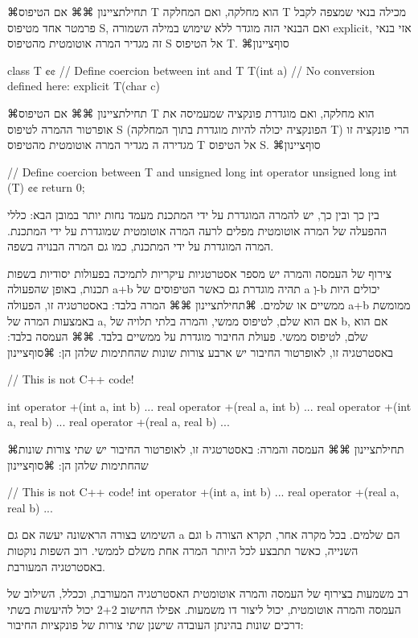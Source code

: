   ⌘תחילת{ציינון}
      ⌘⌘ אם הטיפוס T הוא מחלקה, ואם המחלקה T מכילה בנאי שמצפה לקבל פרמטר אחד מטיפוס S, ואם הבנאי הזה מוגדר ללא שימוש במילה השמורה explicit, אזי בנאי זה מגדיר המרה אוטומטית מהטיפוס S אל הטיפוס T.
    ⌘סוף{ציינון}

      class T {¢¢
        // Define coercion between int and T
        T(int a) {}
        // No conversion defined here:
        explicit T(char c) {}
      }

      ⌘תחילת{ציינון}
      ⌘⌘ אם הטיפוס T הוא מחלקה, ואם מוגדרת פונקציה שמעמיסה את אופרטור ההמרה לטיפוס S (הפונקציה יכולה להיות מוגדרת בתוך המחלקה T) הרי פונקציה זו מגדירה ה מגדיר המרה אוטומטית מהטיפוס T אל הטיפוס S.
    ⌘סוף{ציינון}

      // Define coercion between T and unsigned long int
      operator unsigned long int (T) {¢¢
        return 0;
      }

      בין כך ובין כך, יש להמרה המוגדרת על ידי המתכנת מעמד נחות יותר במובן הבא: כללי ההפעלה של המרה אוטומטית מפלים לרעה המרה אוטומטית שמוגדרת על ידי המתכנת. המרה המוגדרת על ידי המתכנת, כמו גם המרה הבנויה בשפה.

      צירוף של העמסה והמרה
      יש מספר אסטרטגיות עיקריות לתמיכה בפעולות יסודיות בשפות תכנות, באופן שהפעולה a+b תהיה מוגדרת גם כאשר הטיפוסים של a וְ-b יכולים היות ממשיים או שלמים.
      ⌘תחילת{ציינון}
      ⌘⌘ המרה בלבד: באסטרטגיה זו, הפעולה a+b ממומשת באמצעות המרה של a, אם הוא שלם, לטיפוס ממשי, והמרה בלתי תלויה של b, אם הוא שלם, לטיפוס ממשי. פעולת החיבור מוגדרת על ממשיים בלבד.
      ⌘⌘ העמסה בלבד: באסטרטגיה זו, לאופרטור החיבור יש ארבע צורות שונות שהחתימות שלהן הן:
    ⌘סוף{ציינון}

      // This is not C++ code!

      int operator +(int a, int b) {...}
      real operator +(real a, int b) {...}
      real operator +(int a, real b) {...}
      real operator +(real a, real b) {...}

      ⌘תחילת{ציינון}
      ⌘⌘ העמסה והמרה: באסטרטגיה זו, לאופרטור החיבור יש שתי צורות שונות שהחתימות שלהן הן:
    ⌘סוף{ציינון}

      // This is not C++ code!
      int operator +(int a, int b) {...}
      real operator +(real a, real b) {...}

      השימוש בצורה הראשונה יעשה אם גם a וגם b הם שלמים. בכל מקרה אחר, תקרא הצורה השנייה, כאשר תתבצע לכל היותר המרה אחת משלם לממשי.
      רוב השפות נוקטות באסטרטגיה המעורבת.

      רב משמעות בצירוף של העמסה והמרה אוטומטית
      האסטרטגיה המעורבת, וככלל, השילוב של העמסה והמרה אוטומטית, יכול ליצור דו משמעות. אפילו החישוב 2+2 יכול להיעשות בשתי דרכים שונות בהינתן העובדה שישנן שתי צורות של פונקציות החיבור:

